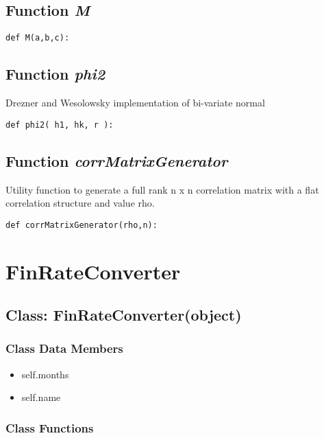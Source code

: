 \documentclass[twoside,11pt]{book}
\begin{document}
\subsection{Function {\it M}}


\begin{lstlisting}
def M(a,b,c):
\end{lstlisting}

\subsection{Function {\it phi2}}
Drezner and Wesolowsky implementation of bi-variate normal 

\begin{lstlisting}
def phi2( h1, hk, r ):
\end{lstlisting}

\subsection{Function {\it corrMatrixGenerator}}
Utility function to generate a full rank n x n correlation matrix with a flat correlation structure and value rho. 

\begin{lstlisting}
def corrMatrixGenerator(rho,n):
\end{lstlisting}

\newpage
\section{FinRateConverter}

\subsection{Class: FinRateConverter(object)}


\subsubsection{Class Data Members}
\begin{itemize}
\item{self.months}
\item{self.name}
\end{itemize}

\subsubsection{Class Functions}
\end{document}

